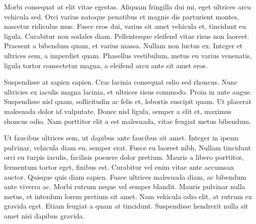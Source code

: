Morbi consequat at elit vitae egestas. Aliquam fringilla dui mi, eget ultrices arcu vehicula sed. Orci varius natoque penatibus et magnis dis parturient montes, nascetur ridiculus mus. Fusce eros dui, varius sit amet vehicula et, tincidunt eu ligula. Curabitur non sodales diam. Pellentesque eleifend vitae risus non laoreet. Praesent a bibendum quam, et varius massa. Nullam non luctus ex. Integer et ultrices sem, a imperdiet quam. Phasellus vestibulum, metus eu varius venenatis, ligula tortor consectetur magna, a eleifend arcu ante sit amet eros.

Suspendisse at sapien sapien. Cras lacinia consequat odio sed rhoncus. Nunc ultricies ex iaculis magna lacinia, et ultrices risus commodo. Proin in ante augue. Suspendisse nisl quam, sollicitudin ac felis et, lobortis suscipit quam. Ut placerat malesuada dolor id vulputate. Donec nisl ligula, semper a elit et, maximus rhoncus odio. Nam porttitor elit a est malesuada, vitae feugiat metus bibendum.

Ut faucibus ultrices sem, ut dapibus ante faucibus sit amet. Integer in ipsum pulvinar, vehicula diam eu, semper erat. Fusce eu laoreet nibh. Nullam tincidunt orci eu turpis iaculis, facilisis posuere dolor pretium. Mauris a libero porttitor, fermentum tortor eget, finibus est. Curabitur vel enim vitae ante accumsan auctor. Quisque quis diam sapien. Fusce ultrices malesuada diam, ac bibendum ante viverra ac. Morbi rutrum neque vel semper blandit. Mauris pulvinar nulla metus, et interdum lorem pretium sit amet. Nam vehicula odio elit, at rutrum ex gravida eget. Etiam feugiat a quam at tincidunt. Suspendisse hendrerit nulla sit amet nisi dapibus gravida.
